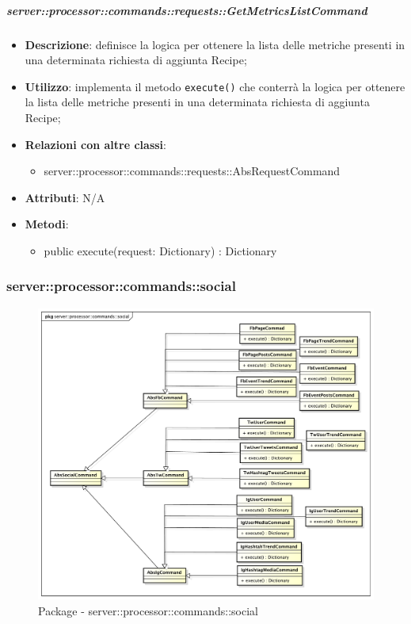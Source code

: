         \subparagraph{server::processor::commands::requests::GetMetricsListCommand} %
        \label{subp:bdsm_app_server_processor_commands_requests_getmetricslistcommand}
        \begin{itemize}
          \item \textbf{Descrizione}: definisce la logica per ottenere la lista delle metriche presenti in una determinata richiesta di aggiunta Recipe;
          \item \textbf{Utilizzo}: implementa il metodo \texttt{execute()} che conterrà la logica per ottenere la lista delle metriche presenti in una determinata richiesta di aggiunta Recipe;
          \item \textbf{Relazioni con altre classi}:
            \begin{itemize}
              \item server::processor::commands::requests::AbsRequestCommand
            \end{itemize}
			\item \textbf{Attributi}: N/A
			\item \textbf{Metodi}:
        	\begin{itemize}
          		\item public execute(request: Dictionary) : Dictionary
        	\end{itemize}
        \end{itemize}

      \subsubsection{server::processor::commands::social} %
      \label{ssub:bdsm_app_server_processor_commands_social}
      \begin{figure}[!htbp]
      	\centering
      	\centerline{\includegraphics[scale=0.4]{./images/server/social.pdf}}
      	\caption{Package - server::processor::commands::social}
      \end{figure}

